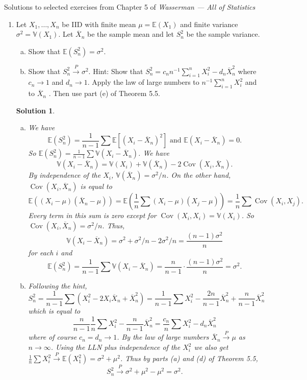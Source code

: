 \documentclass[10pt]{article}
\newtheorem*{sol}{Solution}
\newcommand{\V}{\mathbb{V}}
\newcommand{\E}{\mathbb{E}}
\newcommand{\Cov}{\operatorname{Cov}}
\newcommand{\toP}{\xrightarrow{P}}
\begin{document}
\noindent \large{Solutions to selected exercises from Chapter 5 of
\emph{Wasserman --- All of Statistics}}

\begin{enumerate}
\item[(1)] Let $X_1,\ldots,X_n$ be IID with finite mean $\mu=\E(X_1)$
and finite variance $\sigma^2=\V(X_1)$. Let $\overline X_n$ be the sample mean
and let $S_n^2$ be the sample variance.
\begin{enumerate}[(a)]
\item Show that $\E(S_n^2)=\sigma^2$.
\item Show that $S_n^2 \toP \sigma^2$. Hint: Show that
$S_n^2=c_n n^{-1}\sum_{i=1}^n X_i^2 - d_n\overline X_n^2$
where $c_n\to 1$ and $d_n\to 1$. Apply the law of large numbers to
$n^{-1}\sum_{i=1}^n X_i^2$
and to $\overline X_n$ . Then use part (e) of Theorem 5.5.
\end{enumerate}

\begin{sol}
\begin{enumerate}[(a)]
\item We have
\[
\E(S_n^2) = \frac{1}{n-1} \sum \E[(X_i - \overline X_n)^2] \text{ and }
\E(X_i-\overline X_n) = 0.
\]
So $\E(S_n^2)=\frac{1}{n-1} \sum \V(X_i - \overline X_n)$. We have
\[
\V(X_i-\overline X_n)=\V(X_i) + \V(\overline X_n) - 2\Cov(X_i,\overline X_n).
\]
By independence of the $X_i$, $\V(\overline X_n)=\sigma^2/n$. On the other hand,
$\Cov(X_i, \overline X_n)$ is equal to
\[
\E((X_i-\mu)(\overline X_n-\mu)) =
\E\left(\frac{1}{n}\sum (X_i-\mu) (X_j-\mu)\right) = \frac{1}{n}\sum \Cov(X_i,X_j).
\]
Every term in this sum is zero except for $\Cov(X_i,X_i)=\V(X_i)$. So
$\Cov(X_i,\overline X_n)=\sigma^2/n$. Thus,
\[
\V(X_i-\overline X_n)=\sigma^2 + \sigma^2/n-2\sigma^2/n = \frac{(n-1)\sigma^2}{n}
\]
for each $i$ and
\[
\E(S_n^2)=\frac{1}{n-1} \sum \V(X_i - \overline X_n) =
\frac{n}{n-1}\cdot \frac{(n-1)\sigma^2}{n} = \sigma^2.
\]

\item Following the hint,
\[
S_n^2 = \frac{1}{n-1} \sum (X_i^2 - 2X_i \overline X_n + \overline X_n^2) =
\frac{1}{n-1} \sum X_i^2 - \frac{2n}{n-1} \overline X_n^2 + \frac{n}{n-1}\overline X_n^2
\]
which is equal to
\[
\frac{n}{n-1} \frac{1}{n} \sum X_i^2 - \frac{n}{n-1} \overline X_n^2
= \frac{c_n}{n} \sum X_i^2 - d_n \overline X_n^2
\]
where of course $c_n=d_n\to 1$. By the law of large numbers $\overline X_n\toP\mu$
as $n\to\infty$. Using the LLN plus independence of the $X_i^2$ we also get
$\frac{1}{n}\sum X_i^2 \toP \E(X_1^2)=\sigma^2+\mu^2$. Thus by parts (a) and (d)
of Theorem 5.5,
\[
S_n^2 \toP \sigma^2+\mu^2 - \mu^2 = \sigma^2.
\]
\end{enumerate}
\end{sol}


\end{enumerate}
\end{document}
